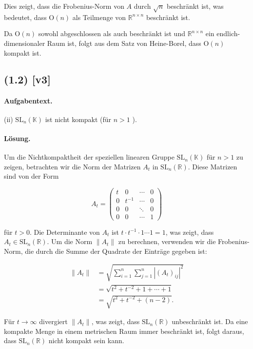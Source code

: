 \documentclass[11pt,a4paper]{article}
\begin{document}
Dies zeigt, dass die Frobenius-Norm von $A$ durch $\sqrt{n}$ beschränkt ist, was bedeutet, dass $\mathrm{O}(n)$ als Teilmenge von $\mathbb{R}^{n \times n}$ beschränkt ist.

Da $\mathrm{O}(n)$ sowohl abgeschlossen als auch beschränkt ist und $\mathbb{R}^{n \times n}$ ein endlich-dimensionaler Raum ist, folgt aus dem Satz von Heine-Borel, dass $\mathrm{O}(n)$ kompakt ist.


\subsection*{(1.2) [v3]}
\paragraph{Aufgabentext.}
(ii) $\mathrm{SL}_n(\mathbb{K})$ ist nicht kompakt (für $n>1$ ).

\paragraph{Lösung.}
Um die Nichtkompaktheit der speziellen linearen Gruppe $\mathrm{SL}_n(\mathbb{K})$ für $n > 1$ zu zeigen, betrachten wir die Norm der Matrizen $A_t$ in $\mathrm{SL}_n(\mathbb{R})$. Diese Matrizen sind von der Form

\[
A_t = \begin{pmatrix}
t & 0 & \cdots & 0 \\
0 & t^{-1} & \cdots & 0 \\
0 & 0 & \ddots & 0 \\
0 & 0 & \cdots & 1
\end{pmatrix}
\]

für $t > 0$. Die Determinante von $A_t$ ist $t \cdot t^{-1} \cdot 1 \cdots 1 = 1$, was zeigt, dass $A_t \in \mathrm{SL}_n(\mathbb{R})$. Um die Norm $\|A_t\|$ zu berechnen, verwenden wir die Frobenius-Norm, die durch die Summe der Quadrate der Einträge gegeben ist:

\begin{align*}
\|A_t\| &= \sqrt{\sum_{i=1}^{n} \sum_{j=1}^{n} |(A_t)_{ij}|^2} \\
&= \sqrt{t^2 + t^{-2} + 1 + \cdots + 1} \\
&= \sqrt{t^2 + t^{-2} + (n-2)}.
\end{align*}

Für $t \to \infty$ divergiert $\|A_t\|$, was zeigt, dass $\mathrm{SL}_n(\mathbb{R})$ unbeschränkt ist. Da eine kompakte Menge in einem metrischen Raum immer beschränkt ist, folgt daraus, dass $\mathrm{SL}_n(\mathbb{R})$ nicht kompakt sein kann.
\end{document}
